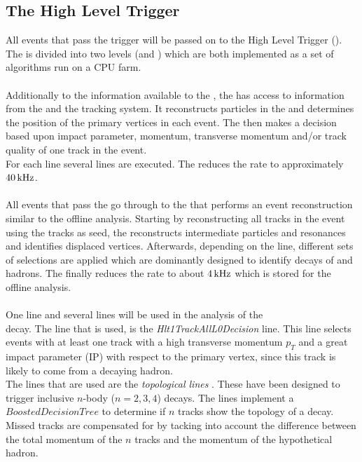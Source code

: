 \subsection{The High Level Trigger}
\label{sec:hlt}
All events that pass the \lone trigger will be passed on to the High Level Trigger (\hlt). The \hlt is divided into two levels (\hltone and \hlttwo) which are both implemented as a set of \cpp algorithms run on a CPU farm.\\
\\
Additionally to the information available to the \lone, the \hltone has access to information from the \velo and the tracking system. It reconstructs particles in the \velo and determines the position of the primary vertices in each event. The \hltone then makes a decision based upon impact parameter, momentum, transverse momentum and/or track quality of one track in the event.\\
For each \lone line several \hltone lines are executed. The \hltone reduces the rate to approximately $40 {\rm \,kHz}$.\\
\\
All events that pass the \hltone go through to the \hlttwo that performs an event reconstruction similar to the offline analysis. Starting by reconstructing all tracks in the event using the \velo tracks as seed, the \hlttwo reconstructs intermediate particles and resonances and identifies displaced vertices. Afterwards, depending on the \hlttwo line, different sets of selections are applied which are dominantly designed to identify decays of \B and \D hadrons. The \hlttwo finally reduces the rate to about $4{\rm \,kHz}$ which is stored for the offline analysis.\\
\\
One \hltone line and several \hlttwo lines will be used in the analysis of the\\ \BdKstee decay. The \hltone line that is used, is the  \textit{Hlt1TrackAllL0Decision} line. This line selects events with at least one track with a high transverse momentum $p_T$ and a great impact parameter (IP) with respect to the primary vertex, since this track is likely to come from a decaying \B hadron.\\
The \hlttwo lines that are used are the \textit{\hlttwo topological lines} \cite{hlt2topo}. These have been designed to trigger inclusive $n$-body ($n = 2,3,4$) \B decays. The \hlttwo lines implement a $Boosted Decision Tree$ to determine if $n$ tracks show the topology of a \B decay. Missed tracks are compensated for by tacking into account the difference between the total momentum of the $n$ tracks and the momentum of the hypothetical \B hadron.\\
\newpage


